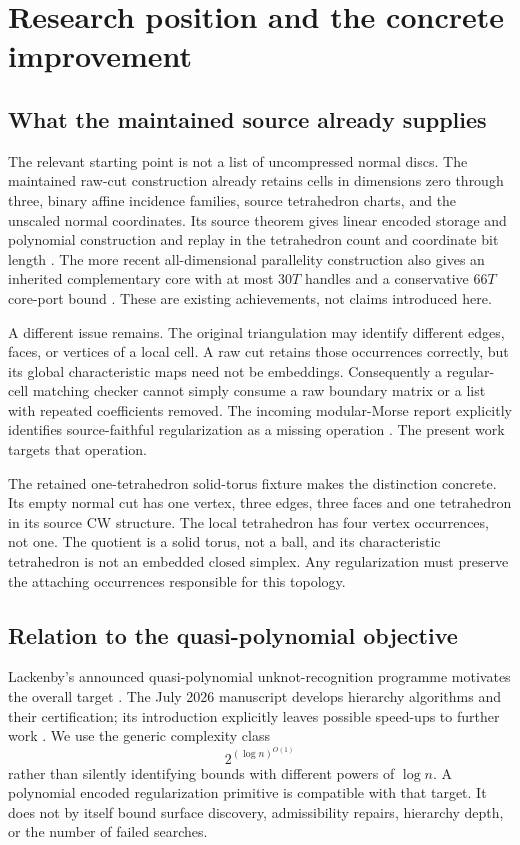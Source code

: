 \documentclass[11pt]{article}
\theoremstyle{definition}\newtheorem{definition}[theorem]{Definition}
\theoremstyle{remark}\newtheorem{remark}[theorem]{Remark}
\begin{document}
\section{Research position and the concrete improvement}
\label{sec:position}

\subsection{What the maintained source already supplies}
The relevant starting point is not a list of uncompressed normal discs. The maintained raw-cut construction already retains cells in dimensions zero through three, binary affine incidence families, source tetrahedron charts, and the unscaled normal coordinates. Its source theorem gives linear encoded storage and polynomial construction and replay in the tetrahedron count and coordinate bit length \cite{rawcut}. The more recent all-dimensional parallelity construction also gives an inherited complementary core with at most \(30T\) handles and a conservative \(66T\) core-port bound \cite{parallelity}. These are existing achievements, not claims introduced here.

A different issue remains. The original triangulation may identify different edges, faces, or vertices of a local cell. A raw cut retains those occurrences correctly, but its global characteristic maps need not be embeddings. Consequently a regular-cell matching checker cannot simply consume a raw boundary matrix or a list with repeated coefficients removed. The incoming modular-Morse report explicitly identifies source-faithful regularization as a missing operation \cite{morse}. The present work targets that operation.

The retained one-tetrahedron solid-torus fixture makes the distinction concrete. Its empty normal cut has one vertex, three edges, three faces and one tetrahedron in its source CW structure. The local tetrahedron has four vertex occurrences, not one. The quotient is a solid torus, not a ball, and its characteristic tetrahedron is not an embedded closed simplex. Any regularization must preserve the attaching occurrences responsible for this topology.

\subsection{Relation to the quasi-polynomial objective}
Lackenby's announced quasi-polynomial unknot-recognition programme motivates the overall target \cite{announcement}. The July 2026 manuscript develops hierarchy algorithms and their certification; its introduction explicitly leaves possible speed-ups to further work \cite{lackenby}. We use the generic complexity class
\[
                 2^{(\log n)^{O(1)}}
\]
rather than silently identifying bounds with different powers of \(\log n\). A polynomial encoded regularization primitive is compatible with that target. It does not by itself bound surface discovery, admissibility repairs, hierarchy depth, or the number of failed searches.
\end{document}
